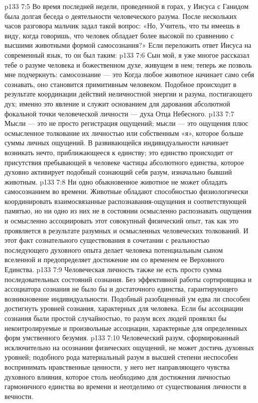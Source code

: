 \vs p133 7:5 Во время последней недели, проведенной в горах, у Иисуса с Ганидом была долгая беседа о деятельности человеческого разума. После нескольких часов разговора мальчик задал такой вопрос: «Но, Учитель, что ты имеешь в виду, когда говоришь, что человек обладает более высокой по сравнению с высшими животными формой самосознания?» Если переложить ответ Иисуса на современный язык, то он был таким:
\vs p133 7:6 \pc Сын мой, я уже многое рассказал тебе о разуме человека и божественном духе, живущем в нем; теперь же позволь мне подчеркнуть: самосознание --- это  Когда любое животное начинает само себя сознавать, оно становится примитивным человеком. Подобное происходит в результате координации действий неличностной энергии и разума, постигающего дух; именно это явление и служит основанием для дарования абсолютной фокальной точки человеческой личности --- духа Отца Небесного.
\vs p133 7:7 Мысли --- это не просто регистрация ощущений; мысли --- это ощущения плюс осмысленное толкование их личностью или собственным «я», которое больше суммы личных ощущений. В развивающейся индивидуальности начинает возникать нечто, приближающееся к единству; это единство происходит от присутствия пребывающей в человеке частицы абсолютного единства, которое духовно активирует подобный сознающий себя разум, изначально бывший животным.
\vs p133 7:8 Ни одно обыкновенное животное не может обладать самосознанием во времени. Животные обладают способностью физиологически координировать взаимосвязанные распознавания\hyp{}ощущения и соответствующей памятью, но ни одно из них не в состоянии осмысленно распознавать ощущения и осмысленно ассоциировать этот совокупный физический опыт, так как это проявляется в результате разумных и осмысленных человеческих толкований. И этот факт сознательного существования в сочетании с реальностью последующего духовного опыта делает человека потенциальным сыном вселенной и предопределяет достижение им со временем ее Верховного Единства.
\vs p133 7:9 Человеческая личность также не есть просто сумма последовательных состояний сознания. Без эффективной работы сортировщика и ассоциатора сознания не было бы и достаточного единства, гарантирующего возникновение индивидуальности. Подобный разобщенный ум едва ли способен достигнуть уровней сознания, характерных для человека. Если бы ассоциации сознания были простой случайностью, то разум всех людей проявлял бы неконтролируемые и произвольные ассоциации, характерные для определенных форм умственного безумия.
\vs p133 7:10 Человеческий разум, сформированный исключительно на осознании физических ощущений, не может достичь духовных уровней; подобного рода материальный разум в высшей степени неспособен воспринимать нравственные ценности, у него нет направляющего чувства духовного влияния, которое столь необходимо для достижения личностью гармоничного единства во времени и неотделимо от существования личности в вечности.
